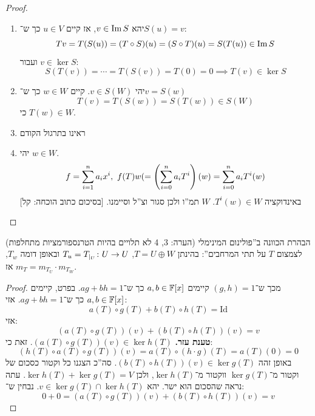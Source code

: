 \documentclass[]{../../../../tex/classes/styledArticle}
\begin{document}
    \begin{proof}
        \begin{enumerate}
            \item יהא $v \in \operatorname{Im} S$, אז קיים $u \in V$ כך ש־$S(u) = v$: 
            \[ Tv = T(S(u)) = (T \circ S)(u) = (S \circ T)(u) = S(T(u)) \in \operatorname{Im} S \]
            ועבור $v \in \ker S$: 
            \[ S(T(v)) = \cdots = T(S(v)) = T(0) = 0 \implies T(v) \in \ker S \]
            \item יהי $v \in S(W)$. קיים $w \in W$ כך ש־$v = S(w)$
            \[ T(v) = T(S(w)) = S(T(w)) \in S(W) \]
            כי $T(w) \in W$. 
            \item ראינו בתרגול הקודם
            \item יהי $w \in W$. 
            \[ f = \sum_{i = 1}^{n}a_ix^{i}, \ f(T)w( = \left ( \sum_{i = 0}^{n}a_iT^{i} \right )(w) = \sum_{i = 0}^{n}a_iT^{i}(w) \]
            באינדוקציה $T^{i}(w) \in W$. $W$ תמ''ו ולכן סגור וצ''ל וסיימנו. [בסיכום כתוב הוכחה: קל]
        \end{enumerate}
    \end{proof}
    (הערה: 3, 4 לא תלויים בהיות הטרנספורמציות מתחלפות)
    הבהרת הכוונה ב''פולינום המינימלי לצמצום $T$ על תתי המרחבים'': בהינתן $T = U \oplus W$, $T_u = T_{\mid_U} \colon U \to U$ ובאופן דומה $T_w$, אז $m_T = m_{T_U} \cdot m_{T_W}$. 
    \begin{proof}
        מכך ש־$(g, h) = 1$ קיימים $a, b \in \mathbb{F}[x]$ כך ש־$ag + bh = 1$. בפרט, קיימים $a, b \in \mathbb{F}[x]$ כך ש־$ag + bh = 1$. אזי: 
        \[ a(T) \circ g(T) + b(T) \circ h(T) = \mathrm{Id} \]
        אזי: 
        \[ (a(T) \circ g(T))(v) + (b(T) \circ h(T))(v) = v \]
        \textbf{טענת עזר. }$(a(T)\circ g(T))(v) \in \ker h(T)$. זאת כי: 
        \[ (h(T) \circ a(T) \circ g(T))(v) = a(T) \circ (h\cdot g)(T) = a(T)(0) = 0 \]
        באופן זהה $(b(T) \circ h(T))(v) \in \ker g(T)$. סה''כ הצגנו כל וקטור כסכום של וקטור מ־$\ker g(T)$ ווקטור מ־$\ker h(T)$, ולכן $\ker h(T) + \ker g(T) = V$. עתה נראה שהסכום הוא ישר. יהא $v \in \ker g(T) \cap \ker h(T)$. נבחין ש־: 
        \[ 0 + 0 = (a(T) \circ g(T))(v) + (b(T) \circ h(T))(v) = v \]
    \end{proof}
    
    
    \ndoc
\end{document}
